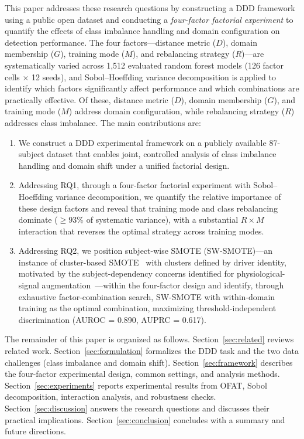 \documentclass[lettersize,journal]{IEEEtran}
\begin{document}
This paper addresses these research questions by constructing a DDD framework using a public open dataset and conducting a \emph{four-factor factorial experiment} to quantify the effects of class imbalance handling and domain configuration on detection performance.
The four factors---distance metric ($D$), domain membership ($G$), training mode ($M$), and rebalancing strategy ($R$)---are systematically varied across 1,512 evaluated random forest models (126 factor cells $\times$ 12 seeds), and Sobol--Hoeffding variance decomposition is applied to identify which factors significantly affect performance and which combinations are practically effective.
Of these, distance metric ($D$), domain membership ($G$), and training mode ($M$) address domain configuration, while rebalancing strategy ($R$) addresses class imbalance.
The main contributions are:

\begin{enumerate}
\item We construct a DDD experimental framework on a publicly available 87-subject dataset that enables joint, controlled analysis of class imbalance handling and domain shift under a unified factorial design.

\item Addressing RQ1, through a four-factor factorial experiment with Sobol--Hoeffding variance decomposition, we quantify the relative importance of these design factors and reveal that training mode and class rebalancing dominate ($\geq 93$\% of systematic variance), with a substantial $R \times M$ interaction that reverses the optimal strategy across training modes.

\item Addressing RQ2, we position subject-wise SMOTE (SW-SMOTE)---an instance of cluster-based SMOTE~\cite{douzas2018} with clusters defined by driver identity, motivated by the subject-dependency concerns identified for physiological-signal augmentation~\cite{bota2024}---within the four-factor design and identify, through exhaustive factor-combination search, SW-SMOTE with within-domain training as the optimal combination, maximizing threshold-independent discrimination (AUROC = 0.890, AUPRC = 0.617).
\end{enumerate}

The remainder of this paper is organized as follows.
Section~\ref{sec:related} reviews related work.
Section~\ref{sec:formulation} formalizes the DDD task and the two data challenges (class imbalance and domain shift).
Section~\ref{sec:framework} describes the four-factor experimental design, common settings, and analysis methods.
Section~\ref{sec:experiments} reports experimental results from OFAT, Sobol decomposition, interaction analysis, and robustness checks.
Section~\ref{sec:discussion} answers the research questions and discusses their practical implications.
Section~\ref{sec:conclusion} concludes with a summary and future directions.
\end{document}

